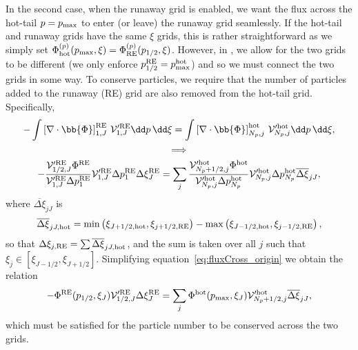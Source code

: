 \documentclass{notes}
\newcommand{\Vp}{\mathcal{V}'}
\begin{document}
    In the second case, when the runaway grid is enabled, we want the flux
    across the hot-tail $p=p_{\rm max}$ to enter (or leave) the runaway grid
    seamlessly. If the hot-tail and runaway grids have the same $\xi$ grids,
    this is rather straightforward as we simply set 
    $\Phi^{(p)}_{\rm hot}(p_{\rm max},\xi) = \Phi^{(p)}_{\rm RE}(p_{1/2},\xi)$.
    However, in \DREAM, we allow for the two grids to be different (we only
    enforce $p^{\rm RE}_{1/2} = p^{\rm hot}_{\rm max}$) and so we must connect
    the two grids in some way. To conserve particles, we require that the
	number of particles added to the runaway (RE) grid are also removed from
	the hot-tail grid. Specifically,
	\begin{equation}\label{eq:fluxCross_origin}
		\begin{gathered}
			-\int \left[\nabla\cdot\bb{\Phi}\right]^{\rm RE}_{1,J}\,\Vp^{\rm RE}_{1,J}\dd p\,\dd\xi =
			\int \left[\nabla\cdot\bb{\Phi}\right]^{\rm hot}_{N_p,j}\,\Vp^{\rm hot}_{N_p,j}\dd p\,\dd\xi,\\
			\implies\\
			-\frac{\Vp^{\rm RE}_{1/2,J}\Phi^{\rm RE}}{\Vp^{\rm RE}_{1,J}\Delta p^{\rm RE}_1}\Vp^{\rm RE}_{1,J}\Delta p^{\rm RE}_1 \Delta\xi^{\rm RE}_J =
			\sum_j\frac{\Vp^{\rm hot}_{N_p+1/2,j}\Phi^{\rm hot}}{\Vp^{\rm hot}_{N_p,j}\Delta p^{\rm hot}_{N_p}}\Vp^{\rm hot}_{N_p,j}\Delta p^{\rm hot}_{N_p} \overline{\Delta\xi}_{jJ},
		\end{gathered}
	\end{equation}
	where $\overline{\Delta\xi}_{jJ}$ is
    \begin{equation}\label{eq:PhiPinterp}
        \overline{\Delta\xi}_{jJ,\rm hot} = \min\left(\xi_{J+1/2,{\rm hot}},\xi_{j+1/2,{\rm RE}}\right) -
        \max\left( \xi_{J-1/2,{\rm hot}}, \xi_{j-1/2,{\rm RE}} \right),
    \end{equation}
    so that $\Delta\xi_{j,\rm RE} = \sum\overline{\Delta\xi}_{jJ,\rm hot}$, and
	the sum is taken over all $j$ such that $\xi_j\in[\xi_{J-1/2}, \xi_{J+1/2}]$.
	Simplifying equation~\eqref{eq:fluxCross_origin} we obtain the relation
    \begin{equation}\label{eq:fluxCross}
        -\Phi^{\rm RE}(p_{1/2},\xi_J)\Vp^{\rm RE}_{1/2,J}\Delta\xi^{\rm RE}_{J} =
        \sum_{j} \Phi^{\rm hot}(p_{\rm max},\xi_J) \Vp^{\rm hot}_{N_p+1/2,j} \overline{\Delta\xi}_{jJ},
    \end{equation}
	which must be satisfied for the particle number to be conserved across the
	two grids.
\end{document}
